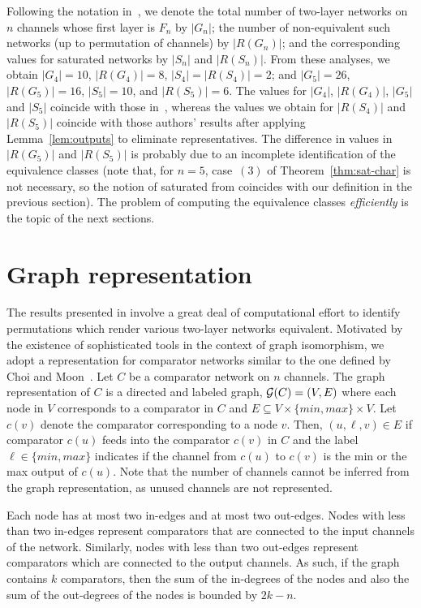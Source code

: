 \documentclass[10pt]{IEEEtran}
\begin{document}
Following the notation in~\cite{DBLP:conf/lata/BundalaZ14}, we denote
the total number of two-layer networks on $n$ channels whose first
layer is $F_n$ by $|G_n|$; 
the number of non-equivalent such networks (up to permutation of
channels) by $|R(G_n)|$; 
and the corresponding values for saturated networks by $|S_n|$ and
$|R(S_n)|$.  
From these analyses, we obtain $|G_4|=10$, $|R(G_4)|=8$,
$|S_4|=|R(S_4)|=2$; and $|G_5|=26$, $|R(G_5)|=16$, $|S_5|=10$, and
$|R(S_5)|=6$.  The values for $|G_4|$, $|R(G_4)|$, $|G_5|$ and $|S_5|$
coincide with those in~\cite{DBLP:conf/lata/BundalaZ14}, whereas the
values we obtain for $|R(S_4)|$ and $|R(S_5)|$ coincide with those authors'
results after applying Lemma~\ref{lem:outputs} to eliminate representatives.
The difference in values in $|R(G_5)|$ and
$|R(S_5)|$ is probably due to an incomplete identification of the
equivalence classes (note that, for $n=5$, case~$(3)$ of
Theorem~\ref{thm:sat-char} is not necessary, so the notion of
saturated from \cite{DBLP:conf/lata/BundalaZ14} coincides with our
definition in the previous section).  The problem of computing the
equivalence classes \emph{efficiently} is the topic of the next
sections.


\section{Graph representation}

The results presented in \cite{DBLP:conf/lata/BundalaZ14} involve a
great deal of computational effort to identify permutations which
render various two-layer networks equivalent. Motivated by the
existence of sophisticated tools in the context of graph isomorphism,
we adopt a representation for comparator networks similar to the one
defined by Choi and Moon~\cite{DBLP:conf/gecco/ChoiM02}.
Let $C$ be a comparator network on $n$ channels.  The graph
representation of $C$ is a directed and labeled graph, ${\cal G}(C)=(V,E)$
where each node in $V$ corresponds to a comparator in $C$ and
$E\subseteq V\times \{min,max\}\times V$.  Let $c(v)$ denote the
comparator corresponding to a node $v$. Then, $(u,\ell,v) \in E$ if
comparator $c(u)$ feeds into the comparator $c(v)$ in $C$ and the
label $\ell\in\{min,max\}$ indicates if the channel from $c(u)$ to
$c(v)$ is the min or the max output of $c(u)$.  Note that the
number of channels cannot be inferred from the graph representation,
as unused channels are not represented.

Each node has at most two in-edges and at most two out-edges. Nodes
with less than two in-edges represent comparators that are connected
to the input channels of the network. Similarly, nodes with less than two
out-edges represent comparators which are connected to the output
channels. As such, if the graph contains $k$ comparators, then the sum of
the in-degrees of the nodes and also the sum of the out-degrees of the
nodes is bounded by $2k-n$.
\end{document}
